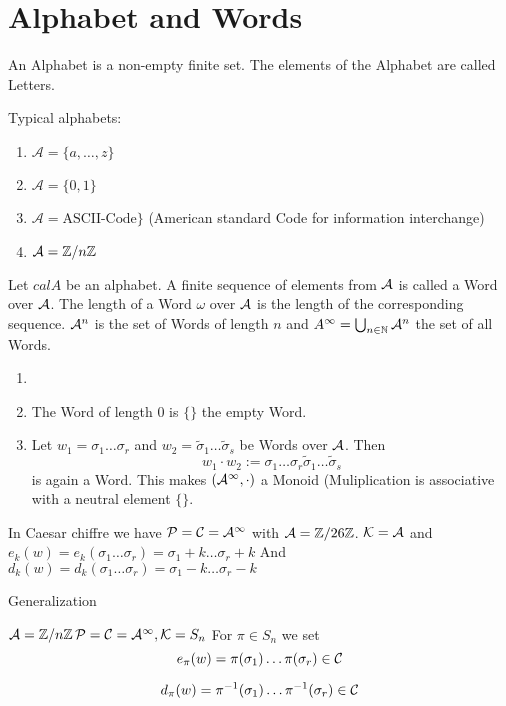 \section{Alphabet and Words}
\begin{Def} 
An Alphabet is a non-empty finite set. The elements of the Alphabet are called Letters.
\end{Def}
\begin{Bsp}
Typical alphabets:
\begin{enumerate}
\item \(\mathcal A=\{a,\dots,z\}\)
\item \(\mathcal A=\{0,1\}\)
\item \(\mathcal A=\text{ASCII-Code}\}\) (American standard Code for information interchange)
\item \(\mathcal A=\mathbb{Z}/n\mathbb{Z}\)
\end{enumerate}
\end{Bsp}
\begin{Def}
Let \(calA\) be an alphabet. A finite sequence of elements from \(\mathcal{A}\) is called a Word over \(\mathcal{A}\). The length of a Word \(\omega\) over \(\mathcal{A}\) is the length of the corresponding sequence.
\(\mathcal{A}^n\) is the set of Words of length \(n\) and \(A^\infty=\bigcup_{n\in \mathbb{N}} \mathcal{A}^n\) the set of all Words.
\end{Def}
\begin{Bem}
\begin{enumerate}
\item[]
\item The Word of length 0 is \(\{\}\) the empty Word.
\item Let \(w_1=\sigma_1\dots\sigma_r\) and \(w_2=\tilde \sigma_1\dots\tilde\sigma_s\) be Words over \(\mathcal{A}\). Then
\[w_1\cdot w_2:= \sigma_1\dots\sigma_r\tilde \sigma_1\dots\tilde\sigma_s\] is again a Word.
This makes \((\mathcal{A}^\infty,\cdot)\) a Monoid (Muliplication is associative with a neutral element \(\{\}\).
\end{enumerate}
\end{Bem}
\begin{Bsp} In Caesar chiffre we have \(\mathcal{P}=\mathcal{C}=\mathcal{A}^\infty\) with \(\mathcal{A}=\mathbb{Z}/26\mathbb{Z}\).
\(\mathcal{K}=\mathcal{A}\)  and
\(e_k(w)=e_k(\sigma_1\dots\sigma_r)= \sigma_1+k\dots\sigma_r+k\)
And \(d_k(w)=d_k(\sigma_1\dots\sigma_r)= \sigma_1-k\dots\sigma_r-k\)
\end{Bsp}
Generalization
\begin{Bsp}
\(\mathcal{A}=\mathbb{Z}/n\mathbb{Z}\, \mathcal{P}=\mathcal{C}=\mathcal{A}^\infty, \mathcal{K}=S_n\)
For \(\pi\in S_n\) we set
\[e_\pi(w)=\pi(\sigma_1)\dots\pi(\sigma_r)\in\mathcal{C}\]

\[d_\pi(w)=\pi^{-1}(\sigma_1)\dots\pi^{-1}(\sigma_r)\in\mathcal{C}\]
\end{Bsp}
